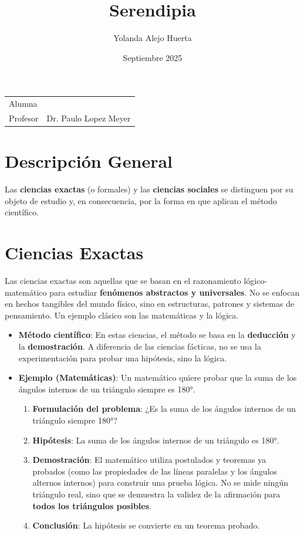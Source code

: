 \documentclass{article}
\title{Serendipia}
\author{Yolanda Alejo Huerta}
\date{Septiembre 2025}
\begin{document}
\maketitle

\noindent\begin{tabular}{@{}ll}
	Alumna & \theauthor\\
	Profesor & Dr. Paulo Lopez Meyer
\end{tabular}

\section*{Descripción General}

Las \textbf{ciencias exactas} (o formales) y las \textbf{ciencias sociales}
se distinguen por su objeto de estudio y, en consecuencia, por la forma en
que aplican el método científico.

\section*{Ciencias Exactas}

Las ciencias exactas son aquellas que se basan en el razonamiento
lógico-matemático para estudiar \textbf{fenómenos abstractos y
universales}. No se enfocan en hechos tangibles del mundo físico,
sino en estructuras, patrones y sistemas de pensamiento. Un ejemplo
clásico son las matemáticas y la lógica. 

\begin{itemize}
  \item \textbf{Método científico}: En estas ciencias, el método se basa
    en la \textbf{deducción} y la \textbf{demostración}. A diferencia de
    las ciencias fácticas, no se usa la experimentación para probar
    una hipótesis, sino la lógica. 
  \item \textbf{Ejemplo (Matemáticas)}: Un matemático quiere probar que
    la suma de los ángulos internos de un triángulo siempre es 180°.
    \begin{enumerate}
      \item \textbf{Formulación del problema}: ¿Es la suma de los
        ángulos internos de un triángulo siempre 180°?
      \item \textbf{Hipótesis}: La suma de los ángulos internos de
        un triángulo es 180°.
      \item \textbf{Demostración}: El matemático utiliza postulados y
        teoremas ya probados (como las propiedades de las líneas paralelas y
        los ángulos alternos internos) para construir una prueba lógica. No
        se mide ningún triángulo real, sino que se demuestra la validez de
        la afirmación para \textbf{todos los triángulos posibles}.
      \item \textbf{Conclusión}: La hipótesis se convierte en un
        teorema probado.
    \end{enumerate}
\end{itemize}
\end{document}
